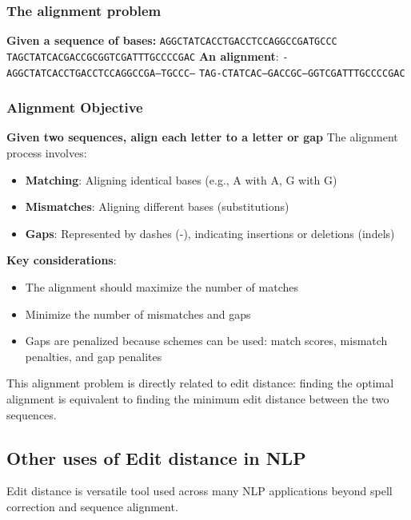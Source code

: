 \documentclass[a4paper]{article}
\theoremstyle{definition}
\begin{document}
\subsubsection{The alignment problem}
\textbf{Given a sequence of bases:}
\vspace{1em}
\noindent 
\newline 
\texttt{AGGCTATCACCTGACCTCCAGGCCGATGCCC}
\vspace{1em}
\noindent 
\newline
\texttt{TAGCTATCACGACCGCGGTCGATTTGCCCCGAC}
\vspace{1em}
\noindent 
\newline
\textbf{An alignment}:
\vspace{1em}
\noindent 
\newline
\texttt{-AGGCTATCACCTGACCTCCAGGCCGA---TGCCC---}
\newline 
\texttt{TAG-CTATCAC--GACCGC--GGTCGATTTGCCCCGAC}
\subsubsection{Alignment Objective}
\textbf{Given two sequences, align each letter to a letter or gap}
\vspace{1em}
\noindent 
\newline
The alignment process involves:
\begin{itemize}
  \item \textbf{Matching}: Aligning identical bases (e.g., A with A, G with G)
  \item \textbf{Mismatches}: Aligning different bases (substitutions)
  \item \textbf{Gaps}: Represented by dashes (-), indicating insertions or deletions (indels)
\end{itemize}
\textbf{Key considerations}:
\begin{itemize}
  \item The alignment should maximize the number of matches 
  \item Minimize the number of mismatches and gaps 
  \item Gaps are penalized because schemes can be used: match scores, mismatch penalties, and gap penalites
\end{itemize}
This alignment problem is directly related to edit distance: finding the optimal alignment is equivalent 
to finding the minimum edit distance between the two sequences.
\subsection{Other uses of Edit distance in NLP}
Edit distance is versatile tool used across many NLP applications beyond spell correction and 
sequence alignment.
\end{document}
